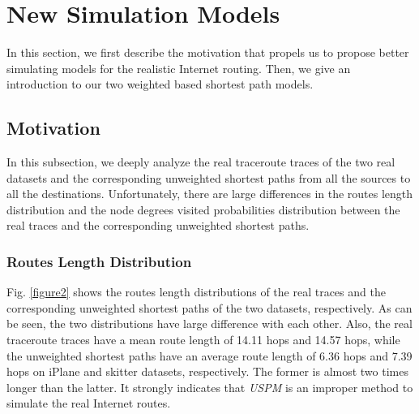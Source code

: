 \documentclass[a4paper]{llncs}
\begin{document}
\begin{comment}
Table \ref{Properties of iPlane and skitter} lists detailed properties of $G$ of the two datasets and we can easily find that the two datasets are different from each other, especially on the average degree.
\end{comment}
\begin{comment}
Besides, Fig. \ref{figure1} shows the $CCDF$ of $G$ of the two datasets, respectively.
From Table \ref{Properties of iPlane and skitter},and Fig. \ref{figure1}, we can easily find that these two are both scale-free networks. We could also learn from Table \ref{Properties of iPlane and
skitter} that the two datasets are different from each
other on {\it average degree}, {\it density}, {\it clustering
coefficient}, and {\it heterogeneity}. However, the other three
features are somewhat related to {\it average degree}. Thus,
we assume that it may be the {\it average degree} that makes the two network
datasets distinguishing.
\end{comment}

\section{New Simulation Models}
\label{sec:models}

In this section, we first describe the motivation that propels us to propose better simulating models for the realistic Internet routing. Then, we give an introduction to our two weighted based shortest path models. 
\subsection{Motivation}
\label{subsec:motivation}
In this subsection, we deeply analyze the real traceroute traces of the two real datasets and the corresponding unweighted shortest paths from all the sources to all the destinations. Unfortunately, there are large differences in the routes length distribution and the node degrees visited probabilities distribution between the real traces and the corresponding unweighted shortest paths.

\subsubsection{Routes Length Distribution}
Fig. \ref{figure2} shows the routes length distributions of the real traces and the corresponding unweighted shortest paths of the two datasets, respectively. As can be seen, the two distributions have large difference with each other. Also, the real traceroute traces have a mean route length of 14.11 hops and 14.57 hops, while the unweighted shortest paths have an average route length of 6.36 hops and 7.39 hops on iPlane and skitter datasets, respectively. The former is almost two times longer than the latter. It strongly indicates that \textit{USPM} is an improper method to simulate the real Internet routes.
\end{document}

